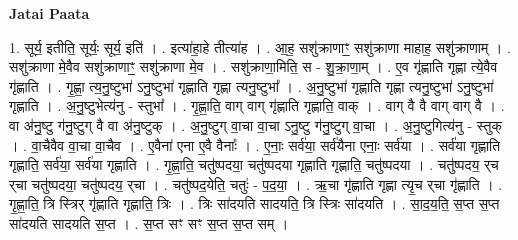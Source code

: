 \documentclass[17pt]{extarticle}
\begin{document}
\textbf{Jatai Paata} \newline

1. सूर्य॒ इतीति॒ सूर्यः॒ सूर्य॒ इति॑ । . इत्या॑हा॒हे तीत्या॑ह । . आ॒ह॒ सशु॑क्राणाꣳ॒॒ सशु॑क्राणा माहाह॒ सशु॑क्राणाम् । . सशु॑क्राणा मे॒वैव सशु॑क्राणाꣳ॒॒ सशु॑क्राणा मे॒व । . सशु॑क्राणा॒मिति॒ स - शु॒क्रा॒णा॒म् । . ए॒व गृ॑ह्णाति गृह्णा त्ये॒वैव गृ॑ह्णाति । . गृ॒ह्णा॒ त्य॒नु॒ष्टुभा॑ ऽनु॒ष्टुभा॑ गृह्णाति गृह्णा त्यनु॒ष्टुभा᳚ । . अ॒नु॒ष्टुभा॑ गृह्णाति गृह्णा त्यनु॒ष्टुभा॑ ऽनु॒ष्टुभा॑ गृह्णाति । . अ॒नु॒ष्टुभेत्य॑नु - स्तुभा᳚ । . गृ॒ह्णा॒ति॒ वाग् वाग् गृ॑ह्णाति गृह्णाति॒ वाक् । . वाग् वै वै वाग् वाग् वै । . वा अ॑नु॒ष्टु ग॑नु॒ष्टुग् वै वा अ॑नु॒ष्टुक् । . अ॒नु॒ष्टुग् वा॒चा वा॒चा ऽनु॒ष्टु ग॑नु॒ष्टुग् वा॒चा । . अ॒नु॒ष्टुगित्य॑नु - स्तुक् । . वा॒चैवैव वा॒चा वा॒चैव । . ए॒वैना॑ एना ए॒वै वैनाः᳚ । . ए॒नाः॒ सर्व॑या॒ सर्व॑यैना एनाः॒ सर्व॑या । . सर्व॑या गृह्णाति गृह्णाति॒ सर्व॑या॒ सर्व॑या गृह्णाति । . गृ॒ह्णा॒ति॒ चतु॑ष्पदया॒ चतु॑ष्पदया गृह्णाति गृह्णाति॒ चतु॑ष्पदया । . चतु॑ष्पदय॒ र्‌च र्‌चा चतु॑ष्पदया॒ चतु॑ष्पदय॒ र्‌चा । . चतु॑ष्पद॒येति॒ चतुः॑ - प॒द॒या॒ । . ऋ॒चा गृ॑ह्णाति गृह्णा त्यृ॒च र्‌चा गृ॑ह्णाति । . गृ॒ह्णा॒ति॒ त्रि स्त्रिर् गृ॑ह्णाति गृह्णाति॒ त्रिः । . त्रिः सा॑दयति सादयति॒ त्रि स्त्रिः सा॑दयति । . सा॒द॒य॒ति॒ स॒प्त स॒प्त सा॑दयति सादयति स॒प्त । . स॒प्त सꣳ सꣳ स॒प्त स॒प्त सम् । \newline
\end{document}
